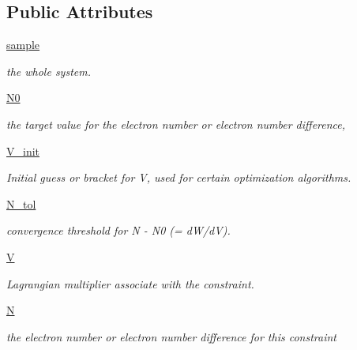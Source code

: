 \subsection*{Public Attributes}
\begin{DoxyCompactItemize}
\item 
\hyperlink{classpycdft_1_1constraint_1_1base_1_1Constraint_afde90d6ecf3181a7def56d385f8d4343}{sample}
\begin{DoxyCompactList}\small\item\em the whole system. \end{DoxyCompactList}\item 
\hypertarget{classpycdft_1_1constraint_1_1base_1_1Constraint_ab42a0b84ae37bd40526fdde8434976a3}{\hyperlink{classpycdft_1_1constraint_1_1base_1_1Constraint_ab42a0b84ae37bd40526fdde8434976a3}{N0}}\label{classpycdft_1_1constraint_1_1base_1_1Constraint_ab42a0b84ae37bd40526fdde8434976a3}

\begin{DoxyCompactList}\small\item\em the target value for the electron number or electron number difference, \end{DoxyCompactList}\item 
\hyperlink{classpycdft_1_1constraint_1_1base_1_1Constraint_a10702275a9ba0a31ac92595d64099d08}{V\-\_\-init}
\begin{DoxyCompactList}\small\item\em Initial guess or bracket for V, used for certain optimization algorithms. \end{DoxyCompactList}\item 
\hyperlink{classpycdft_1_1constraint_1_1base_1_1Constraint_a843989087e2c8114ff2ce36bc6a391f8}{N\-\_\-tol}
\begin{DoxyCompactList}\small\item\em convergence threshold for N -\/ N0 (= d\-W/d\-V). \end{DoxyCompactList}\item 
\hyperlink{classpycdft_1_1constraint_1_1base_1_1Constraint_aa8ee88182fc2f1bd74bf5cafbedc11b4}{V}
\begin{DoxyCompactList}\small\item\em Lagrangian multiplier associate with the constraint. \end{DoxyCompactList}\item 
\hypertarget{classpycdft_1_1constraint_1_1base_1_1Constraint_adfdff34ccbfc538959d3cb2d097d9d29}{\hyperlink{classpycdft_1_1constraint_1_1base_1_1Constraint_adfdff34ccbfc538959d3cb2d097d9d29}{N}}\label{classpycdft_1_1constraint_1_1base_1_1Constraint_adfdff34ccbfc538959d3cb2d097d9d29}

\begin{DoxyCompactList}\small\item\em the electron number or electron number difference for this constraint \end{DoxyCompactList}\end{DoxyCompactItemize}


